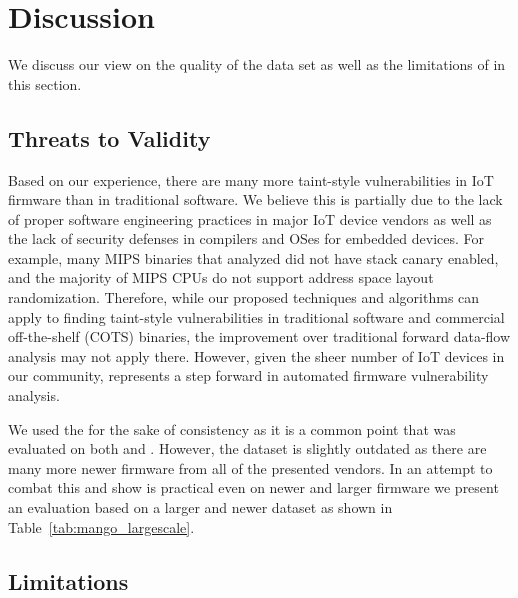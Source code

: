 \section{Discussion}
\label{sec:discussion}

We discuss our view on the quality of the data set as well as the limitations of \mango in this section.

\subsection{Threats to Validity}

Based on our experience, there are many more taint-style vulnerabilities in IoT firmware than in traditional software.
We believe this is partially due to the lack of proper software engineering practices in major IoT device vendors as well as the lack of security defenses in compilers and OSes for embedded devices.
For example, many MIPS binaries that \mango analyzed did not have stack canary enabled, and the majority of MIPS CPUs do not support address space layout randomization.
Therefore, while our proposed techniques and algorithms can apply to finding taint-style vulnerabilities in traditional software and commercial off-the-shelf (COTS) binaries, the improvement over traditional forward data-flow analysis may not apply there.
However, given the sheer number of IoT devices in our community, \mango represents a step forward in automated firmware vulnerability analysis.

We used the \karonteDataset for the sake of consistency as it is a common point that was evaluated on both \satc and \karonte.
However, the dataset is slightly outdated as there are many more newer firmware from all of the presented vendors.
In an attempt to combat this and show \mango is practical even on newer and larger firmware we present an evaluation based on a larger and newer dataset as shown in Table~\ref{tab:mango_largescale}.


\subsection{Limitations}

